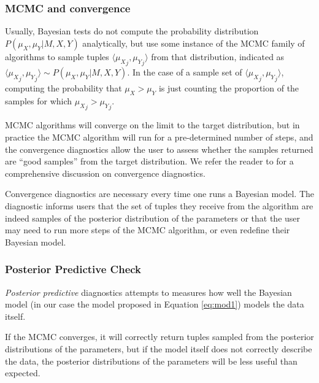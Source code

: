 \documentclass[twoside,11pt,preprint]{article}
\begin{document}
\hypertarget{mcmc-and-convergence}{%
\subsubsection{MCMC and convergence}\label{mcmc-and-convergence}}

Usually, Bayesian tests do not compute the probability distribution
\(P(\mu_X,\mu_Y | M, X, Y)\) analytically, but use some instance of the
MCMC family of algorithms to sample tuples \(\langle {\mu_X}_j,{\mu_Y}_j \rangle\) from that distribution, indicated as
\(\langle {\mu_X}_j,{\mu_Y}_j \rangle \sim P(\mu_X,\mu_Y | M, X, Y)\).
In the case of a sample set of \(\langle {\mu_X}_j,{\mu_Y}_j \rangle\),
computing the probability that \(\mu_X > \mu_Y\) is just counting the
proportion of the samples for which \({\mu_X}_j > {\mu_Y}_j\).

MCMC algorithms will converge on the limit to
the target distribution, but in practice the MCMC algorithm will run
for a pre-determined number of steps, and the convergence diagnostics
allow the user to assess whether the samples returned are ``good
samples'' from the target distribution. We refer the reader to
\citet{mcmcdiag} for a comprehensive discussion on convergence diagnostics.

Convergence diagnostics are necessary every time one runs a Bayesian
model. The diagnostic informs users that the set of tuples they
receive from the algorithm are indeed samples of the posterior
distribution of the parameters or that the user may need to run more
steps of the MCMC algorithm, or even redefine their Bayesian model.

\hypertarget{posterior-predictive-check}{%
\subsubsection{Posterior Predictive Check}\label{posterior-predictive-check}}

\emph{Posterior predictive} diagnostics attempts to measures how well
the Bayesian model (in our case the model proposed in Equation
\ref{eq:mod1}) models the data itself.

If the MCMC converges, it will
correctly return tuples sampled from the posterior distributions of
the parameters, but if the model itself does not correctly describe
the data, the posterior distributions of the parameters will be less
useful than expected.
\end{document}
